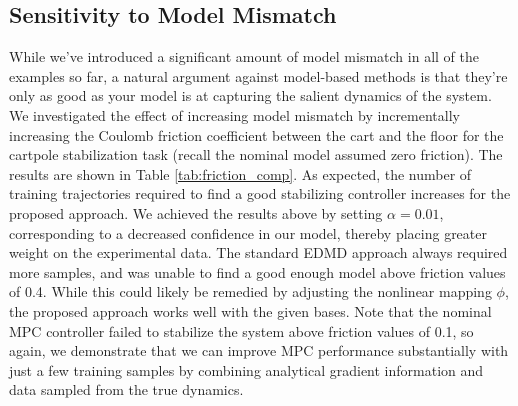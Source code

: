 \documentclass[../root.tex]{subfiles}
\begin{document}

\subsection{Sensitivity to Model Mismatch}

While we've introduced a significant amount of model mismatch in all of the examples so far,
a natural argument against model-based methods is that they're only as good as your model is
at capturing the salient dynamics of the system.  We investigated the effect of increasing
model mismatch by incrementally increasing the Coulomb friction coefficient between the cart
and the floor for the cartpole stabilization task (recall the nominal model assumed zero
friction). The results are shown in Table \ref{tab:friction_comp}. As expected, the number
of training trajectories required to find a good stabilizing controller increases for the
proposed approach. We achieved the results above by setting $\alpha = 0.01$, corresponding 
to a decreased confidence in our model, thereby placing greater weight on the experimental 
data. The standard EDMD approach always required more samples, and was unable to find a good
enough model above friction values of 0.4. While this could likely be remedied by adjusting
the nonlinear mapping $\phi$, the proposed approach works well with the given bases.  Note
that the nominal MPC controller failed to stabilize the system above friction values of 0.1,
so again, we demonstrate that we can improve MPC performance substantially with just a few
training samples by combining analytical gradient information and data sampled from the true
dynamics.
\end{document}
